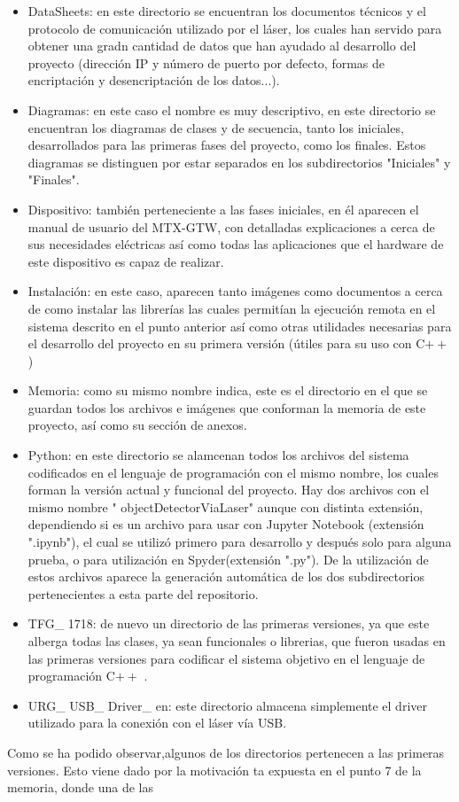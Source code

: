 \begin{itemize}
	\item DataSheets: en este directorio se encuentran los documentos técnicos y el protocolo de comunicación utilizado por el láser, los cuales han servido para obtener una gradn cantidad de datos que han ayudado al desarrollo del proyecto (dirección IP y número de puerto por defecto, formas de encriptación y desencriptación de los datos...).
	\item Diagramas: en este caso el nombre es muy descriptivo, en este directorio se encuentran los diagramas de clases y de secuencia, tanto los iniciales, desarrollados para las primeras fases del proyecto, como los finales. Estos diagramas se distinguen por estar separados en los subdirectorios "Iniciales" y "Finales".
	\item Dispositivo: también perteneciente a las fases iniciales, en él aparecen el manual de usuario del MTX-GTW, con detalladas explicaciones a cerca de sus necesidades eléctricas así como todas las aplicaciones que el hardware de este dispositivo es capaz de realizar.
	\item Instalación: en este caso, aparecen tanto imágenes como documentos a cerca de como instalar las librerías las cuales permitían la ejecución remota en el sistema descrito en el punto anterior así como otras utilidades necesarias para el desarrollo del proyecto en su primera versión (útiles para su uso con C$++$)
	\item Memoria: como su mismo nombre indica, este es el directorio en el que se guardan todos los archivos e imágenes que conforman la memoria de este proyecto, así como su sección de anexos.
	\item Python: en este directorio se alamcenan todos los archivos del sistema codificados en el lenguaje de programación con el mismo nombre, los cuales forman la versión actual y funcional del proyecto. Hay dos archivos con el mismo nombre " objectDetectorViaLaser" aunque con distinta extensión, dependiendo si es un archivo para usar con Jupyter Notebook (extensión ".ipynb"), el cual se utilizó primero para desarrollo y después solo para alguna prueba, o para utilización en Spyder(extensión ".py"). De la utilización de estos archivos aparece la generación automática de los dos subdirectorios pertenecientes a esta parte del repositorio.
	\item TFG\_ 1718: de nuevo un directorio de las primeras versiones, ya que este alberga todas las clases, ya sean funcionales o librerias, que fueron usadas en las primeras versiones para codificar el sistema objetivo en el lenguaje de programación C$++$ .
	\item URG\_ USB\_ Driver\_ en: este directorio almacena simplemente el driver utilizado para la conexión con el láser vía USB.
\end{itemize}
Como se ha podido observar,algunos de los directorios pertenecen a las primeras versiones. Esto viene dado por la motivación ta expuesta en el punto 7 de la memoria, donde una de las 
